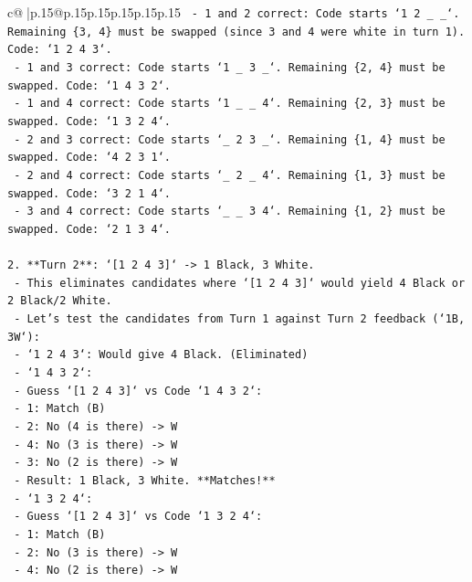 \documentclass{article}
\begin{document}
{\begin{supertabular}{c@{$\;$}|p{.15\linewidth}@{}p{.15\linewidth}p{.15\linewidth}p{.15\linewidth}p{.15\linewidth}p{.15\linewidth}}
{{{\texttt{        {-} 1 and 2 correct: Code starts `1 2 \_ \_`. Remaining \{3, 4\} must be swapped (since 3 and 4 were white in turn 1). Code: `1 2 4 3`.} \\
\texttt{        {-} 1 and 3 correct: Code starts `1 \_ 3 \_`. Remaining \{2, 4\} must be swapped. Code: `1 4 3 2`.} \\
\texttt{        {-} 1 and 4 correct: Code starts `1 \_ \_ 4`. Remaining \{2, 3\} must be swapped. Code: `1 3 2 4`.} \\
\texttt{        {-} 2 and 3 correct: Code starts `\_ 2 3 \_`. Remaining \{1, 4\} must be swapped. Code: `4 2 3 1`.} \\
\texttt{        {-} 2 and 4 correct: Code starts `\_ 2 \_ 4`. Remaining \{1, 3\} must be swapped. Code: `3 2 1 4`.} \\
\texttt{        {-} 3 and 4 correct: Code starts `\_ \_ 3 4`. Remaining \{1, 2\} must be swapped. Code: `2 1 3 4`.} \\
\\ 
\texttt{2.  **Turn 2**: `{[}1 2 4 3{]}` {-}> 1 Black, 3 White.} \\
\texttt{    {-} This eliminates candidates where `{[}1 2 4 3{]}` would yield 4 Black or 2 Black/2 White.} \\
\texttt{    {-} Let's test the candidates from Turn 1 against Turn 2 feedback (`1B, 3W`):} \\
\texttt{        {-} `1 2 4 3`: Would give 4 Black. (Eliminated)} \\
\texttt{        {-} `1 4 3 2`:} \\
\texttt{          {-} Guess `{[}1 2 4 3{]}` vs Code `1 4 3 2`:} \\
\texttt{            {-} 1: Match (B)} \\
\texttt{            {-} 2: No (4 is there) {-}> W} \\
\texttt{            {-} 4: No (3 is there) {-}> W} \\
\texttt{            {-} 3: No (2 is there) {-}> W} \\
\texttt{            {-} Result: 1 Black, 3 White. **Matches!**} \\
\texttt{        {-} `1 3 2 4`:} \\
\texttt{          {-} Guess `{[}1 2 4 3{]}` vs Code `1 3 2 4`:} \\
\texttt{            {-} 1: Match (B)} \\
\texttt{            {-} 2: No (3 is there) {-}> W} \\
\texttt{            {-} 4: No (2 is there) {-}> W} \\
}}}
\end{supertabular}}
\end{document}
